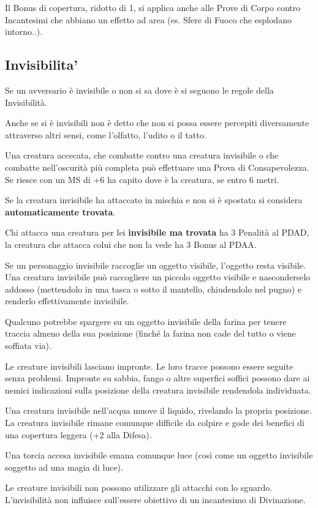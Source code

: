 \documentclass[12pt,a4paper,twoside,openany]{book}
\begin{document}
\begin{multicols}{2}
\begin{itemize}
\end{itemize}
	
Il Bonus di copertura, ridotto di 1, si applica anche alle Prove di Corpo contro Incantesimi che abbiano un effetto ad area (es. Sfere di Fuoco che esplodano intorno..).
	
\subsection{Invisibilita'} \hypertarget{invisibilita}{}\label{invisibilita}
	
Se un avversario è invisibile o non si sa dove è si seguono le regole della Invisibilità.

Anche se si è invisibili non è detto che non si possa essere percepiti diversamente attraverso altri sensi, come l'olfatto, l'udito o il tatto. 	

Una creatura accecata, che combatte contro una creatura invisibile o che combatte nell'oscurità più completa può effettuare una Prova di Consapevolezza. Se riesce con un MS di +6 ha capito dove è la creatura, se entro 6 metri.
	
Se la creatura invisibile ha attaccato in mischia e non si è spostata si considera \textbf{automaticamente trovata}.
	
Chi attacca una creatura per lei \textbf{invisibile ma trovata} ha 3 Penalità al PDAD, la creatura che attacca colui che non la vede ha 3 Bonus al PDAA.
	
\bigskip
	
Se un personaggio invisibile raccoglie un oggetto visibile, l'oggetto resta visibile. Una creatura invisibile può raccogliere un piccolo oggetto visibile e nasconderselo addosso (mettendolo in una tasca o sotto il mantello, chiudendolo nel pugno) e renderlo effettivamente invisibile.
	
Qualcuno potrebbe spargere su un oggetto invisibile della farina per tenere traccia almeno della sua posizione (finché la farina non cade del tutto o viene soffiata via).
	
Le creature invisibili lasciano impronte. Le loro tracce possono essere seguite senza problemi. Impronte su sabbia, fango o altre superfici soffici possono dare ai nemici indicazioni sulla posizione della creatura invisibile rendendola individuata.
	
Una creatura invisibile nell'acqua muove il liquido, rivelando la propria posizione. La creatura invisibile rimane comunque difficile da colpire e gode dei benefici di una copertura leggera (+2 alla Difesa).
	
Una torcia accesa invisibile emana comunque luce (così come un oggetto invisibile soggetto ad una magia di luce).
	
Le creature invisibili non possono utilizzare gli attacchi con lo sguardo. L'invisibilità non influisce sull'essere obiettivo di un incantesimo di Divinazione.
	
\end{multicols}
\end{document}
